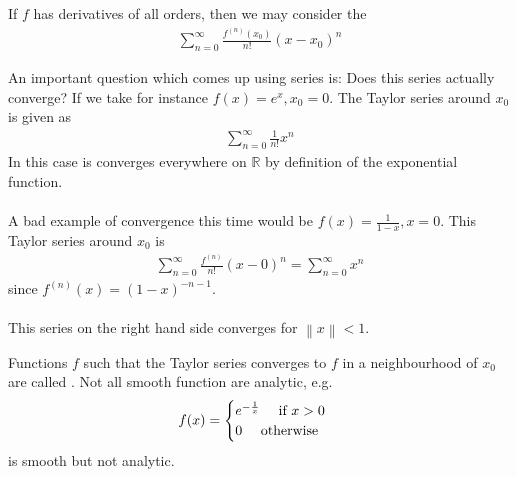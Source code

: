 \begin{definition}
If $f$ has derivatives of all orders, then we may consider the 
\begin{align*} 
	\sum_{n = 0}^{\infty}\frac{f^{\left(n\right)}\left(x_0\right)}{n!} \left(x - x_0\right)^{n}
\end{align*}
\end{definition}
An important question which comes up using series is: Does this series actually converge? If we take for instance $f\left(x\right) =  e^{x}, x_0 = 0$. The Taylor series around $x_0$ is given as 
\begin{align*} \sum_{n = 0}^{\infty}\frac{1}{n!}x^{n} \end{align*}
In this case is converges everywhere on $ \mathbb{R}$ by definition of the exponential function.\\
$ $\\
A bad example of convergence this time would be $f\left(x\right) = \frac{1}{1 - x}, x = 0$. This Taylor series around $x_0$ is 
\begin{align*} \sum_{n= 0}^{\infty}\frac{f^{\left(n\right)}}{n!}\left(x - 0\right)^n = \sum_{n= 0}^{\infty}x^{n}  \end{align*}
since $f^{\left(n\right)}\left(x\right)= \left(1 - x\right)^{-n - 1}$.\\
$ $\\
This series on the right hand side converges for $\left\| x\right\| < 1$.


\begin{framedremark}
	Functions $f$ such that the Taylor series converges to $f$ in a neighbourhood of $x_0$ are called . Not all smooth function are analytic, e.g.
	\begin{align*} 
		f\left(x\right) =  \begin{cases}
		e^{-\frac{1}{x}} \mathspace \text{ if } x > 0\\ 0 \mathspace \text{ otherwise}
		\end{cases}
	\end{align*}
	is smooth but not analytic.
\end{framedremark}

